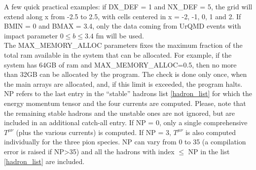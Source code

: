 \documentclass[12pt, a4paper]{article}
\begin{document}
A few quick practical examples: if DX\_DEF = 1 and NX\_DEF = 5, the grid will extend along x from -2.5 to 2.5, with cells centered in x = -2, -1, 0, 1 and 2. If BMIN = 0 and BMAX = 3.4, only the data coming from UrQMD events with impact parameter $0\leq b\leq 3.4$ fm will be used.\\
The MAX\_MEMORY\_ALLOC parameters fixes the maximum fraction of the total ram available in the system that can be allocated. For example, if the system has 64GB of ram and MAX\_MEMORY\_ALLOC=0.5, then no more than 32GB can be allocated by the program. The check is done only once, when the main arrays are allocated, and, if this limit is exceeded, the program halts.\\
NP refers to the last entry in the ``stable'' hadrons list \ref{hadron_list} for which the energy momentum tensor and the four currents are computed. Please, note that the remaining stable hadrons and the unstable ones are not ignored, but are included in an additional catch-all entry. If NP = 0, only a single comprehensive $T^{\mu\nu}$ (plus the various currents) is computed. If NP = 3, $T^{\mu\nu}$ is also computed individually for the three pion species. NP can vary from 0 to 35 (a compilation error is raised if NP>35) and all the hadrons with index $\le$ NP in the list \ref{hadron_list} are included.
\end{document}
